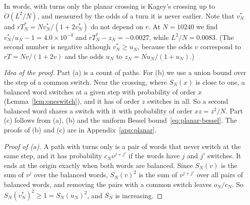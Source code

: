 In words, with turns only the planar crossing is Kagey's crossing up to $O(L^2/N)$, and measured by
the odds of a turn it is never earlier. Note that $v^*_N$ and $rT^*_N=Nv^*_N/(1+2v^*_N)$ do not
depend on $r$. At $N=10240$ we find $v^*_N/u_N-1=4.0\times10^{-4}$ and $rT^*_N-z_N=-0.0027$, while
$L^2/N=0.0083$. (The second number is negative although $v^*_N\ge u_N$, because the odds $v$
correspond to $rT=Nv/(1+2v)$ and the odds $u_N$ to $z_N=Nu_N/(1+u_N)$.)

\emph{Idea of the proof.} Part (a) is a count of paths. For (b) we use a union bound over the step
of a common switch. Near the crossing, where $S_N(x)$ is close to one, a balanced word switches
at a given step with probability of order $x$ (Lemma~\ref{lem:oneswitch}), and it has of order
$z$ switches in all. So a second balanced
word shares a switch with it with probability of order $xz=z^2/N$. Part (c) follows from (a), (b)
and the uniform Bessel bound~\eqref{eq:planar-bessel}. The proofs of (b) and (c) are in
Appendix~\ref{app:planar}.

\begin{proof}[Proof of (a)]
A path with turns only is a pair of words that never switch at the same step, and it has
probability $c_Nv^{j+j'}$ if the words have $j$ and $j'$ switches. It ends at the origin exactly
when both words are balanced. Since $S_N(v)$ is the sum of $v^j$ over the balanced words,
$S_N(v)^2$ is the sum of $v^{j+j'}$ over all pairs of balanced words, and removing the pairs with a
common switch leaves $o_N/c_N$. So $S_N(v^*_N)^2\ge1=S_N(u_N)^2$, and $S_N$ is increasing.
\end{proof}
